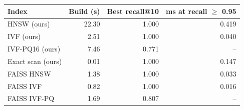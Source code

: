 \begin{tabular}{lrrr}
\toprule
Index & Build (s) & Best recall@10 & ms at recall $\geq$ 0.95 \\
\midrule
HNSW (ours) & 22.30 & 1.000 & 0.419 \\
IVF (ours) & 2.51 & 1.000 & 0.040 \\
IVF-PQ16 (ours) & 7.46 & 0.771 & -- \\
Exact scan (ours) & 0.01 & 1.000 & 0.147 \\
FAISS HNSW & 1.38 & 1.000 & 0.033 \\
FAISS IVF & 0.82 & 1.000 & 0.016 \\
FAISS IVF-PQ & 1.69 & 0.807 & -- \\
\bottomrule
\end{tabular}
